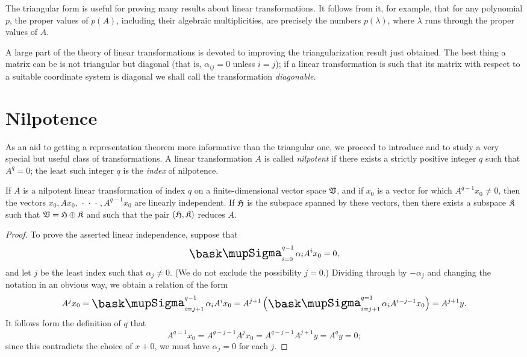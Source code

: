 The triangular form is useful for proving many results about linear
transformations. It follows from it, for example, that for any polynomial \(p\),
the proper values of \(p(A)\), including their algebraic multiplicities, are
precisely the numbers \(p(\lambda)\), where \(\lambda\) runs through the proper
values of \(A\).

A large part of the theory of linear transformations is devoted to improving the
triangularization result just obtained. The best thing a matrix can be is not
triangular but diagonal (that is, \(\alpha_{ij} = 0\) unless \(i = j\)); if a
linear transformation is such that its matrix with respect to a suitable
coordinate system is diagonal we shall call the transformation
\emph{diagonable}.


\section{Nilpotence}

As an aid to getting a representation theorem more informative than the
triangular one, we proceed to introduce and to study a very special but useful
class of transformations. A linear transformation \(A\) is called
\emph{nilpotent} if there exists a strictly positive integer \(q\) such that
\(A^q = 0\); the least such integer \(q\) is the \emph{index} of nilpotence.

\begin{theorem}
    If \(A\) is a nilpotent linear transformation of index \(q\) on a
    finite-dimensional vector space \(\mathfrak{V}\), and if \(x_0\) is a vector for
    which \(A^{q-1}x_0 \neq 0\), then the vectors \(x_0, Ax_0,
    \,\cdot\,\cdot\,\cdot\,, A^{q-1}x_0\) are linearly independent. If
    \(\frak{H}\) is the subspace spanned by these vectors, then there exists a
    subspace \(\frak{K}\) such that \(\mathfrak{V} = \frak{H} \oplus \frak{K}\) and
    such that the pair \((\frak{H}, \frak{K})\) reduces \(A\).
\end{theorem}

\begin{proof}
    To prove the asserted linear independence, suppose that
    \begin{equation*}
        \sumx_{i=0}^{q-1} \alpha_i A^ix_0 =0,
    \end{equation*}
    and let \(j\) be the least index such that \(\alpha_j \neq 0\). (We do not exclude the possibility \(j = 0\).) Dividing through by \(-\alpha_j\) and changing the notation in an obvious way, we obtain a relation of the form
    \begin{equation*}
        A^jx_0 = \sumx_{i=j+1}^{q-1} \alpha_i A^ix_0 = A^{j+1} \left( \sumx_{i=j+1}^{q=1} \alpha_i A^{i-j-1}x_0\right) = A^{j+1}y.
    \end{equation*}
    It follows form the definition of \(q\) that
    \begin{equation*}
        A^{q=1}x_0 = A^{q-j-1}A^j x_0 = A^{q-j-1}A^{j+1}y = A^{q}y = 0;
    \end{equation*}
    since this contradicts the choice of \(x+0\), we must have \(\alpha_j = 0\) for each \(j\).
\end{proof}

